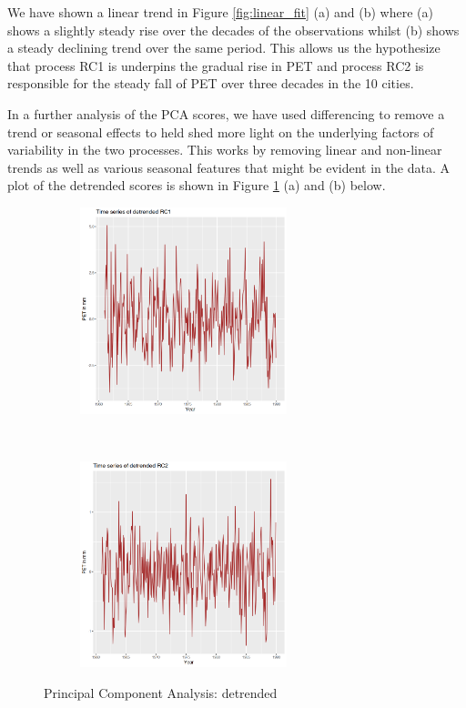 \documentclass[12pt,a4paper]{article}
\begin{document}
We have shown a linear trend in Figure \ref{fig:linear_fit} (a) and (b) where (a) shows a slightly steady rise over the decades of the observations whilst (b) shows a steady declining trend over the same period.  This  allows us the hypothesize that  process RC1 is underpins the gradual rise in PET and process RC2 is responsible for the steady fall of PET over three decades in the 10 cities.

In a further analysis of the PCA scores, we have  used differencing to remove a trend or seasonal effects to held shed more light on the underlying factors of variability in the two processes.  This  works by removing linear and non-linear trends as well as various seasonal features that might be evident in the data.  A plot of the detrended scores is shown in Figure  \ref{fig:detrended_ts} (a) and (b) below.  
\begin{figure}[!h]
    \centering
    \begin{subfigure}[t]{0.5\textwidth}
        \centering
        \includegraphics[width=\textwidth,height=170pt]{./gaphics/q002_g.png}
        \caption{}
    \end{subfigure}%
    ~ 
    \begin{subfigure}[t]{0.5\textwidth}
        \centering
        \includegraphics[width=\textwidth,height=170pt]{./gaphics/q002_h.png}
        \caption{}
    \end{subfigure}
    \caption{Principal Component Analysis: detrended}
    \label{fig:detrended_ts}
\end{figure}
\end{document}
